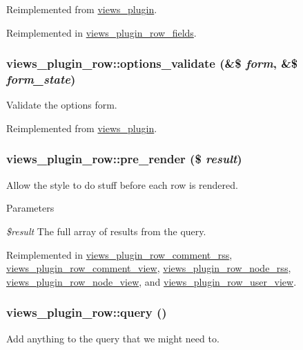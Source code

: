Reimplemented from \hyperlink{classviews__plugin_a442b0f392deb52725ec8159e05654e06}{views\_\-plugin}.

Reimplemented in \hyperlink{classviews__plugin__row__fields_ab9bddfa302a7098aad70693840bbbb6e}{views\_\-plugin\_\-row\_\-fields}.\hypertarget{classviews__plugin__row_a32906ab357ff63a5e6ea22d53c3a5e6a}{
\subsubsection[{options\_\-validate}]{\setlength{\rightskip}{0pt plus 5cm}views\_\-plugin\_\-row::options\_\-validate (\&\$ {\em form}, \/  \&\$ {\em form\_\-state})}}
\label{classviews__plugin__row_a32906ab357ff63a5e6ea22d53c3a5e6a}
Validate the options form. 

Reimplemented from \hyperlink{classviews__plugin_a46d72eb35feea36fed83cd1355a47431}{views\_\-plugin}.\hypertarget{classviews__plugin__row_ae49a23f750874e4b3d294aa3a20ecd64}{
\subsubsection[{pre\_\-render}]{\setlength{\rightskip}{0pt plus 5cm}views\_\-plugin\_\-row::pre\_\-render (\$ {\em result})}}
\label{classviews__plugin__row_ae49a23f750874e4b3d294aa3a20ecd64}
Allow the style to do stuff before each row is rendered.


\begin{DoxyParams}{Parameters}
\item[{\em \$result}]The full array of results from the query. \end{DoxyParams}


Reimplemented in \hyperlink{classviews__plugin__row__comment__rss_a1c64dc0cd4f677ddb85a0dbedfae291e}{views\_\-plugin\_\-row\_\-comment\_\-rss}, \hyperlink{classviews__plugin__row__comment__view_a0cb891a0afff2975d9a04c9d879ee5a5}{views\_\-plugin\_\-row\_\-comment\_\-view}, \hyperlink{classviews__plugin__row__node__rss_a1306492166ea78aa60c5e199e5299260}{views\_\-plugin\_\-row\_\-node\_\-rss}, \hyperlink{classviews__plugin__row__node__view_a5a6428b6994ff8c0ff52e1e9022fc8eb}{views\_\-plugin\_\-row\_\-node\_\-view}, and \hyperlink{classviews__plugin__row__user__view_a42d62630e62ef31aef94a88fccf173cb}{views\_\-plugin\_\-row\_\-user\_\-view}.\hypertarget{classviews__plugin__row_abfc5a6936d485f19d49cfd9eae094f8f}{
\subsubsection[{query}]{\setlength{\rightskip}{0pt plus 5cm}views\_\-plugin\_\-row::query ()}}
\label{classviews__plugin__row_abfc5a6936d485f19d49cfd9eae094f8f}
Add anything to the query that we might need to. 


